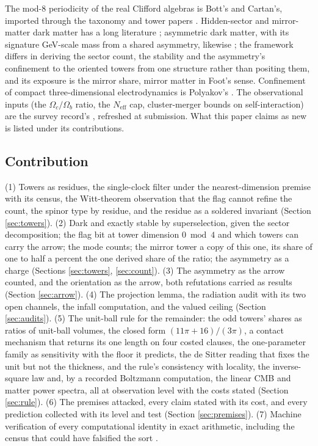 \documentclass[11pt]{article}
\theoremstyle{definition}
\newcommand{\Neff}{N_{\mathrm{eff}}}
\begin{document}
The mod-8 periodicity of the real Clifford algebras is Bott's and Cartan's, imported through the taxonomy and tower papers \cite{ButlerT1, ButlerT3}. Hidden-sector and mirror-matter dark matter has a long literature \cite{FootMirror2004}; asymmetric dark matter, with its signature GeV-scale mass from a shared asymmetry, likewise \cite{Zurek2014}; the framework differs in deriving the sector count, the stability and the asymmetry's confinement to the oriented towers from one structure rather than positing them, and its exposure is the mirror share, mirror matter in Foot's sense. Confinement of compact three-dimensional electrodynamics is Polyakov's \cite{Polyakov1977}. The observational inputs (the $\Omega_{c}/\Omega_{b}$ ratio, the $\Neff$ cap, cluster-merger bounds on self-interaction) are the survey record's \cite{Planck2018, Clowe2006}, refreshed at submission. What this paper claims as new is listed under its contributions.

\subsection*{Contribution}

(1) Towers as residues, the single-clock filter under the nearest-dimension premise with its census, the Witt-theorem observation that the flag cannot refine the count, the spinor type by residue, and the residue as a soldered invariant (Section \ref{sec:towers}). (2) Dark and exactly stable by superselection, given the sector decomposition; the flag bit at tower dimension $0 \bmod 4$ and which towers can carry the arrow; the mode counts; the mirror tower a copy of this one, its share of one to half a percent the one derived share of the ratio; the asymmetry as a charge (Sections \ref{sec:towers}, \ref{sec:count}). (3) The asymmetry as the arrow counted, and the orientation as the arrow, both refutations carried as results (Section \ref{sec:arrow}). (4) The projection lemma, the radiation audit with its two open channels, the infall computation, and the valued ceiling (Section \ref{sec:audits}). (5) The unit-ball rule for the remainder: the odd towers' shares as ratios of unit-ball volumes, the closed form $(11\pi + 16)/(3\pi)$, a contact mechanism that returns its one length on four costed clauses, the one-parameter family as sensitivity with the floor it predicts, the de Sitter reading that fixes the unit but not the thickness, and the rule's consistency with locality, the inverse-square law and, by a recorded Boltzmann computation, the linear CMB and matter power spectra, all at observation level with the costs stated (Section \ref{sec:rule}). (6) The premises attacked, every claim stated with its cost, and every prediction collected with its level and test (Section \ref{sec:premises}). (7) Machine verification of every computational identity in exact arithmetic, including the census that could have falsified the sort \cite{ButlerVerifyT14}.
\end{document}
